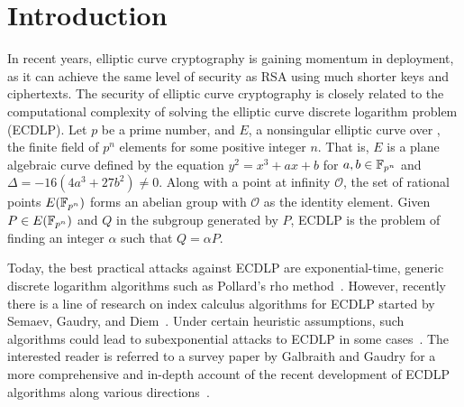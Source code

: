 %
%

\section{Introduction}
%
In recent years, elliptic curve cryptography is gaining momentum in
deployment, as it can achieve the same level of security as RSA using
much shorter keys and ciphertexts.
%
The security of elliptic curve cryptography is closely related to the
computational complexity of solving the elliptic curve discrete
logarithm problem (ECDLP).
%
Let $p$ be a prime number, and $E$, a nonsingular elliptic curve over
, the finite field of $p^n$ elements for some positive integer
$n$.
%
That is, $E$ is a plane algebraic curve defined by the equation
$y^2=x^3+ax+b$ for $a,b\in\mathbb F_{p^n}$ and $\Delta=-16(4a^3+27b^2)\neq 0$.
%
Along with a point at infinity $\mathcal O$, the set of rational
points $E(\mathbb F_{p^n})$ forms an abelian group with $\mathcal O$ as the
identity element.
%
Given $P\in E(\mathbb F_{p^n})$ and $Q$ in the subgroup generated by $P$,
ECDLP is the problem of finding an integer $\alpha$ such that
$Q=\alpha P$.

Today, the best practical attacks against ECDLP are exponential-time,
generic discrete logarithm algorithms such as Pollard's rho
method~\cite{1978-pollard-kangaroo}.
%
However, recently there is a line of research on index calculus
algorithms for ECDLP started by Semaev, Gaudry, and
Diem~\cite{DBLP:journals/iacr/Semaev04,DBLP:journals/jsc/Gaudry09,DBLP:journals/moc/Diem11}.
%
Under certain heuristic assumptions, such algorithms could lead to
subexponential attacks to ECDLP in some
cases~\cite{DBLP:conf/eurocrypt/FaugerePPR12,DBLP:journals/iacr/PetitQ12,DBLP:conf/iwsec/HuangPST13}.
%
The interested reader is referred to a survey paper by Galbraith and
Gaudry for a more comprehensive and in-depth account of the recent
development of ECDLP algorithms along various
directions~\cite{DBLP:journals/dcc/GalbraithG16}.

